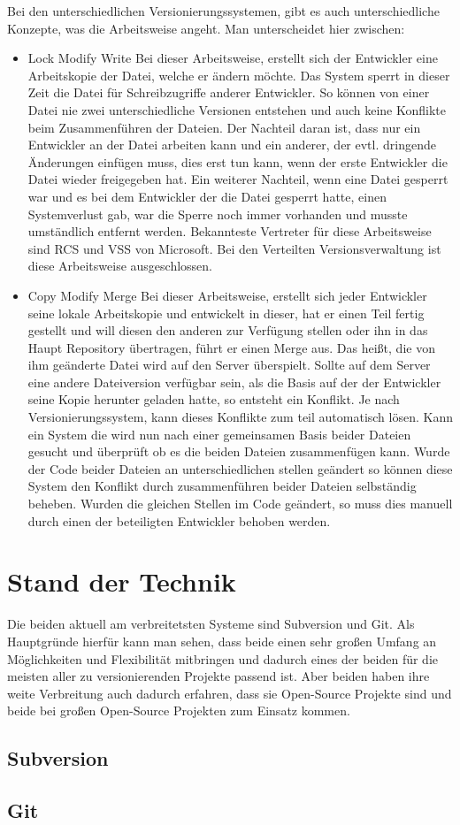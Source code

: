 Bei den unterschiedlichen Versionierungssystemen, gibt es auch unterschiedliche Konzepte, was die Arbeitsweise angeht. Man unterscheidet hier zwischen:
\begin{itemize}
\item Lock Modify Write
Bei dieser Arbeitsweise, erstellt sich der Entwickler eine Arbeitskopie der Datei, welche er ändern möchte. Das System sperrt in dieser Zeit die Datei für Schreibzugriffe anderer Entwickler. So können von einer Datei nie zwei unterschiedliche Versionen entstehen und auch keine Konflikte beim Zusammenführen der Dateien. Der Nachteil daran ist, dass nur ein Entwickler an der Datei arbeiten kann und ein anderer, der evtl. dringende Änderungen einfügen muss, dies erst tun kann, wenn der erste Entwickler die Datei wieder freigegeben hat. Ein weiterer Nachteil, wenn eine Datei gesperrt war und es bei dem Entwickler der die Datei gesperrt hatte, einen Systemverlust gab, war die Sperre noch immer vorhanden und musste umständlich entfernt werden. Bekannteste Vertreter für diese Arbeitsweise sind RCS und VSS von Microsoft. Bei den Verteilten Versionsverwaltung ist diese Arbeitsweise ausgeschlossen.

\item Copy Modify Merge
Bei dieser Arbeitsweise, erstellt sich jeder Entwickler seine lokale Arbeitskopie und entwickelt in dieser, hat er einen Teil fertig gestellt und will diesen den anderen zur Verfügung stellen oder ihn in das Haupt Repository übertragen, führt er einen Merge aus. Das heißt, die von ihm geänderte Datei wird auf den Server überspielt. 
Sollte auf dem Server eine andere Dateiversion verfügbar sein, als die Basis auf der der Entwickler seine Kopie herunter geladen hatte, so entsteht ein Konflikt. 
Je nach Versionierungssystem, kann dieses Konflikte zum teil automatisch lösen. 
Kann ein System die wird nun nach einer gemeinsamen Basis beider Dateien gesucht und überprüft ob es die beiden Dateien zusammenfügen kann. Wurde der Code beider Dateien an unterschiedlichen stellen geändert so können diese System den Konflikt durch zusammenführen beider Dateien selbständig beheben. Wurden die gleichen Stellen im Code geändert, so muss dies manuell durch einen der beteiligten Entwickler behoben werden. 
\end{itemize}

\section{Stand der Technik}
Die beiden aktuell am verbreitetsten Systeme sind Subversion und Git. Als Hauptgründe hierfür kann man sehen, dass beide einen sehr großen Umfang an Möglichkeiten und Flexibilität mitbringen und dadurch eines der beiden für die meisten aller zu versionierenden Projekte passend ist. Aber beiden haben ihre weite Verbreitung auch dadurch erfahren, dass sie Open-Source Projekte sind und beide bei großen Open-Source Projekten zum Einsatz kommen.
\subsection{Subversion}


\subsection{Git}

